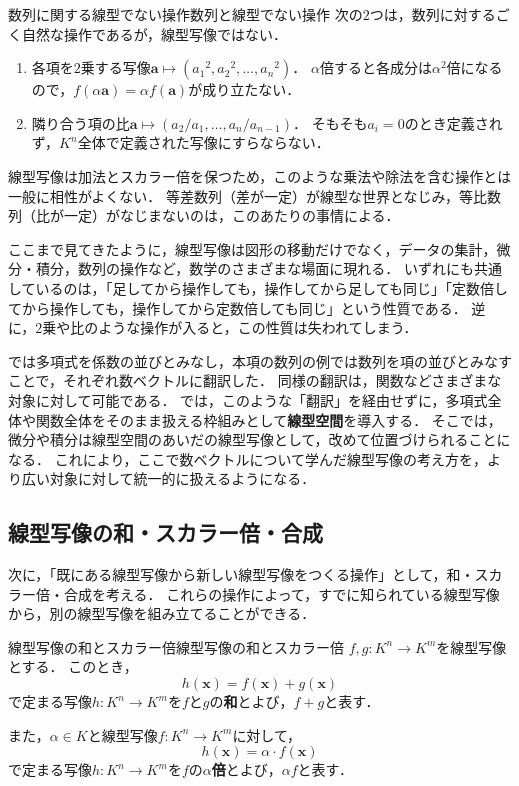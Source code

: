 \begin{example}{数列に関する線型でない操作}{数列と線型でない操作}
次の$2$つは，数列に対するごく自然な操作であるが，線型写像ではない．
\begin{enumerate}[label=(\arabic*),leftmargin=3.2em]
\item 各項を$2$乗する写像$\bm{a} \mapsto ({a_1}^2, {a_2}^2, \dots, {a_n}^2)$．
$\alpha$倍すると各成分は$\alpha^2$倍になるので，$f(\alpha\bm{a}) = \alpha f(\bm{a})$が成り立たない．
\item 隣り合う項の比$\bm{a} \mapsto (a_2/a_1, \dots, a_n/a_{n-1})$．
そもそも$a_i = 0$のとき定義されず，$K^n$全体で定義された写像にすらならない．
\end{enumerate}
線型写像は加法とスカラー倍を保つため，このような乗法や除法を含む操作とは一般に相性がよくない．
等差数列（差が一定）が線型な世界となじみ，等比数列（比が一定）がなじまないのは，このあたりの事情による．
\end{example}

ここまで見てきたように，線型写像は図形の移動だけでなく，データの集計，微分・積分，数列の操作など，数学のさまざまな場面に現れる．
いずれにも共通しているのは，「足してから操作しても，操作してから足しても同じ」「定数倍してから操作しても，操作してから定数倍しても同じ」という性質である．
逆に，$2$乗や比のような操作が入ると，この性質は失われてしまう．

\begin{mycolumn}
  では多項式を係数の並びとみなし，本項の数列の例では数列を項の並びとみなすことで，それぞれ数ベクトルに翻訳した．
  同様の翻訳は，関数などさまざまな対象に対して可能である．
  では，このような「翻訳」を経由せずに，多項式全体や関数全体をそのまま扱える枠組みとして\textbf{線型空間}を導入する．
  そこでは，微分や積分は線型空間のあいだの線型写像として，改めて位置づけられることになる．
  これにより，ここで数ベクトルについて学んだ線型写像の考え方を，より広い対象に対して統一的に扱えるようになる．
\end{mycolumn}

\subsection{線型写像の和・スカラー倍・合成}

次に，「既にある線型写像から新しい線型写像をつくる操作」として，和・スカラー倍・合成を考える．
これらの操作によって，すでに知られている線型写像から，別の線型写像を組み立てることができる．

\begin{definition}{線型写像の和とスカラー倍}{線型写像の和とスカラー倍}
  $f, g \colon K^n \to K^m$を線型写像とする．
  このとき，
  \[
    h(\bm{x}) = f(\bm{x}) + g(\bm{x})
  \]
  で定まる写像$h \colon K^n \to K^m$を$f$と$g$の\textbf{和}とよび，$f + g$と表す．

  また，$\alpha \in K$と線型写像$f \colon K^n \to K^m$に対して，
  \[
    h(\bm{x}) = \alpha \cdot f(\bm{x})
  \]
  で定まる写像$h \colon K^n \to K^m$を$f$の\textbf{$\alpha$倍}とよび，$\alpha f$と表す．
\end{definition}

